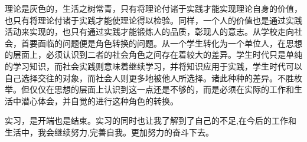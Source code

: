 \documentclass[UTF8]{ctexart}
\begin{document}
\par
理论是灰色的，生活之树常青，只有将理论付诸于实践才能实现理论自身的价值，也只有将理论付诸于实践才能使理论得以检验。同样，一个人的价值也是通过实践活动来实现的，也只有通过实践才能锻炼人的品质，彰现人的意志。从学校走向社会，首要面临的问题便是角色转换的问题。从一个学生转化为一个单位人，在思想的层面上，必须认识到二者的社会角色之间存在着较大的差异。学生时代只是单纯的学习知识，而社会实践则意味着继续学习，并将知识应用于实践，学生时代可以自己选择交往的对象，而社会人则更多地被他人所选择。诸此种种的差异。不胜枚举。但仅仅在思想的层面上认识到这一点还是不够的，而是必须在实际的工作和生活中潜心体会，并自觉的进行这种角色的转换。
\par
实习，是开端也是结束。实习的同时也让我了解到了自己的不足,在今后的工作和生活中，我会继续努力,完善自我。更加努力的奋斗下去。
%
\end{document}
